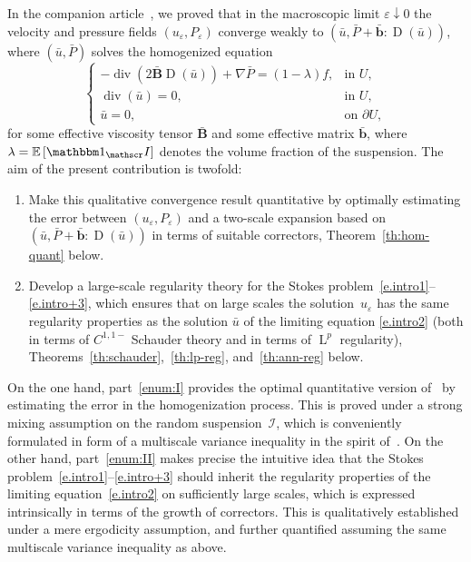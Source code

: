 \documentclass[JEP,XML,SOM,Unicode,published]{cedram}
\let\mathcal\mathscr
\newcounter{assumption}
\let\mathds\mathbbm
\theoremstyle{plain}
\theoremstyle{definition}
\newcommand{\e}{\varepsilon}
\newcommand{\Ic}{\mathcal I}
\newcommand{\D}{\operatorname{D}}
\newcommand{\bb}{\bar{\boldsymbol b}}
\newcommand{\Bb}{\bar{\boldsymbol B}}
\newcommand{\Ld}{\operatorname{L}}
\newcommand{\Div}{{\operatorname{div}}}
\newcommand{\expec}[1]{\mathbb{E}\left[ #1 \right]}
\begin{document}
In the companion article~\cite{DG-19}, we proved that in the macroscopic limit $\e \downarrow 0$ the velocity and pressure fields $(u_\e,P_\e)$ converge weakly to $(\bar u, \bar P+\bb:\D(\bar u))$, where $(\bar u,\bar P)$ solves the homogenized equation
\begin{equation}\label{e.intro2}
\begin{cases}
-\Div(2\Bb \D(\bar u))+\nabla\bar P=(1-\lambda) f ,&\text{in $U$},\\
\Div(\bar u)=0,&\text{in $U$},\\
\bar u=0,&\text{on $\partial U$},
\end{cases}
\end{equation}
for some effective viscosity tensor $\Bb$ and some effective matrix $\bb$, where $\lambda=\expec{\mathds1_\Ic}$ denotes the volume fraction of the suspension.
The aim of the present contribution is twofold:
\begin{enumerate}\renewcommand{\theenumi}{\Roman{enumi}}
\item\label{enum:I} Make this qualitative convergence result quantitative by optimally estimating the error between $(u_\e,P_\e)$ and a two-scale expansion based on $(\bar u, \bar P+\bb:\D(\bar u))$ in terms of suitable correctors, \cf Theorem~\ref{th:hom-quant} below.
\item\label{enum:II} Develop a large-scale regularity theory for the Stokes problem~\eqref{e.intro1}--\eqref{e.intro+3}, which ensures that on large scales the solution~$u_\e$ has the same
regularity properties as the solution $\bar u$ of the limiting equation \eqref{e.intro2} (both in terms of $C^{1,1-}$ Schauder theory and in terms of $\Ld^p$ regularity), \cf Theorems~\ref{th:schauder},~\ref{th:lp-reg}, and~\ref{th:ann-reg} below.
\end{enumerate}
On the one hand, part~\eqref{enum:I} provides the optimal quantitative version of~\cite{DG-19} by estimating the error in the homogenization process.
This is proved under a strong mixing assumption on the random suspension~$\Ic$, which is conveniently formulated in form of a multiscale variance inequality in the spirit of~\cite{DG1,DG2}.
On the other hand, part~\eqref{enum:II}
makes precise the intuitive idea that the Stokes problem~\eqref{e.intro1}--\eqref{e.intro+3} should inherit the regularity properties of the limiting equation~\eqref{e.intro2} on sufficiently large scales, which is expressed intrinsically in terms of the growth of correctors.
This is qualitatively established under a mere ergodicity assumption, and further quantified assuming the same multiscale variance inequality as above.
\end{document}
